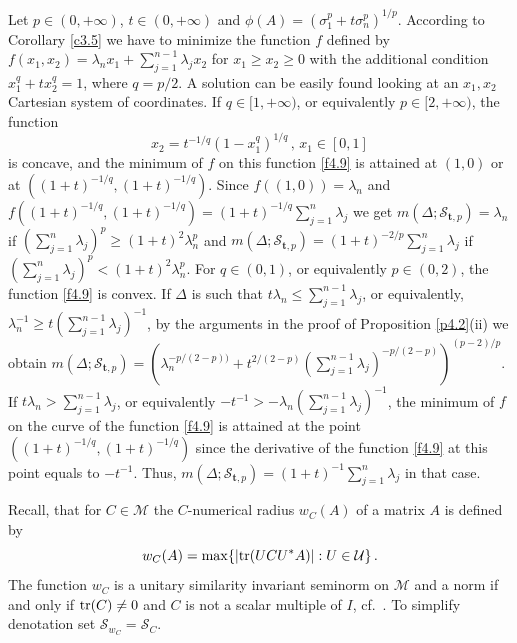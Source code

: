 \documentclass{amsart}
\begin{document}
\begin{exe}  \label{e4.5}
    Let $p \in (0,+\infty)$, $t \in (0,+\infty)$ and $\phi(A)= (\sigma_1^p+t \sigma_n^p)^{1/p}$. According to Corollary \ref{c3.5} we have to minimize the function $f$ defined by $f(x_1,x_2) = \lambda_nx_1 + \sum_{j=1}^{n-1} \lambda_j x_2$ for $x_1 \geq x_2 \geq 0$ with the additional condition $x_1^q + tx_2^q =1$, where $q=p/2$. A solution can be easily found looking at an $x_1,x_2$ Cartesian system of coordinates. If $q \in [1,+\infty)$, or equivalently $p \in [2,+\infty)$, the function
    \begin{equation} \label{f4.9}
        x_2= t^{-1/q}(1-x_1^q)^{1/q}  \,  ,  \,  x_1 \in [0,1]
    \end{equation}
is concave, and the minimum of $f$ on this function \eqref{f4.9} is attained at $(1,0)$  or at $((1+t)^{-1/q}, (1+t)^{-1/q})$. Since $f((1,0))= \lambda_n$ and $f((1+t)^{-1/q}, (1+t)^{-1/q})=(1+t)^{-1/q} \sum_{j=1}^n \lambda_j$ we get  $m(\Delta ; {\mathcal S}_{{\mathbf t}, p})=\lambda_n$ if $(\sum_{j=1}^n \lambda_j )^p \geq (1+t)^2 \lambda_n^p$ and  $m(\Delta ; {\mathcal S}_{{\mathbf t}, p})=(1+t)^{-2/p} \sum_{j=1}^n \lambda_j$ if $(\sum_{j=1}^n \lambda_j )^p < (1+t)^2 \lambda_n^p$. For $q \in (0,1)$, or equivalently $p \in (0,2)$, the function \eqref{f4.9} is convex. If $\Delta$ is such that $t \lambda_n \leq \sum_{j=1}^{n-1} \lambda_j$, or equivalently, $\lambda_n^{-1} \geq t (\sum_{j=1}^{n-1} \lambda_j)^{-1}$, by the arguments in the proof of Proposition \ref{p4.2}(ii) we obtain  $m(\Delta ; {\mathcal S}_{{\mathbf t}, p})= \left( \lambda_n^{-p/(2-p))} + t^{2/(2-p)} \left(\sum_{j=1}^{n-1} \lambda_j\right)^{-p/(2-p)} \right)^{(p-2)/p}$. If $t \lambda_n > \sum_{j=1}^{n-1} \lambda_j$, or equivalently $-t^{-1} > -\lambda_n (\sum_{j=1}^{n-1} \lambda_j )^{-1}$, the minimum of $f$ on the curve of the function \eqref{f4.9} is attained at the point $((1+t)^{-1/q}, (1+t)^{-1/q})$ since the derivative of the function \eqref{f4.9} at this point equals to $-t^{-1}$. Thus,  $m(\Delta ; {\mathcal S}_{{\mathbf t}, p}) = (1+t)^{-1} \sum_{j=1}^{n} \lambda_j$ in that case. 
\end{exe}

Recall, that for $C \in \mathcal M$ the $C$-numerical radius $w_C(A)$ of a matrix $A$ is defined by
\begin{equation} \label{f4.10}
    w_C(A) = \max \{ | {\rm tr}(UCU^*A) | : U \in {\mathcal U} \} \, .
\end{equation}
The function $w_C$ is a unitary similarity invariant seminorm on $\mathcal M$ and a norm if and only if ${\rm tr}(C) \not= 0$ and $C$ is not a scalar multiple of $I$, cf.~\cite[IV.4.4]{Bh}. To simplify denotation set ${\mathcal S}_{w_C} = {\mathcal S}_C$.
\end{document}
